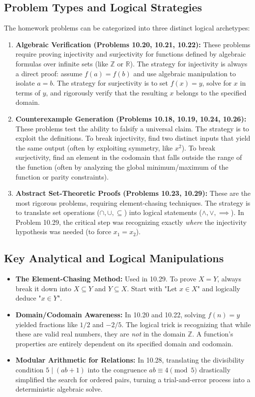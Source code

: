 \documentclass[11pt, a4paper]{article}
\theoremstyle{definition}
\theoremstyle{remark}
\newcommand{\R}{\mathbb{R}}
\newcommand{\Z}{\mathbb{Z}}
\begin{document}
\subsection{Problem Types and Logical Strategies}
The homework problems can be categorized into three distinct logical archetypes:
\begin{enumerate}
    \item \textbf{Algebraic Verification (Problems 10.20, 10.21, 10.22):} These problems require proving injectivity and surjectivity for functions defined by algebraic formulas over infinite sets (like $\Z$ or $\R$). The strategy for injectivity is always a direct proof: assume $f(a) = f(b)$ and use algebraic manipulation to isolate $a = b$. The strategy for surjectivity is to set $f(x) = y$, solve for $x$ in terms of $y$, and rigorously verify that the resulting $x$ belongs to the specified domain.
    \item \textbf{Counterexample Generation (Problems 10.18, 10.19, 10.24, 10.26):} These problems test the ability to falsify a universal claim. The strategy is to exploit the definitions. To break injectivity, find two distinct inputs that yield the same output (often by exploiting symmetry, like $x^2$). To break surjectivity, find an element in the codomain that falls outside the range of the function (often by analyzing the global minimum/maximum of the function or parity constraints).
    \item \textbf{Abstract Set-Theoretic Proofs (Problems 10.23, 10.29):} These are the most rigorous problems, requiring element-chasing techniques. The strategy is to translate set operations ($\cap, \cup, \subseteq$) into logical statements ($\land, \lor, \implies$). In Problem 10.29, the critical step was recognizing exactly \textit{where} the injectivity hypothesis was needed (to force $x_1 = x_2$).
\end{enumerate}

\subsection{Key Analytical and Logical Manipulations}
\begin{itemize}
    \item \textbf{The Element-Chasing Method:} Used in 10.29. To prove $X = Y$, always break it down into $X \subseteq Y$ and $Y \subseteq X$. Start with "Let $x \in X$" and logically deduce "$x \in Y$".
    \item \textbf{Domain/Codomain Awareness:} In 10.20 and 10.22, solving $f(n) = y$ yielded fractions like $1/2$ and $-2/5$. The logical trick is recognizing that while these are valid real numbers, they are \textit{not} in the domain $\Z$. A function's properties are entirely dependent on its specified domain and codomain.
    \item \textbf{Modular Arithmetic for Relations:} In 10.28, translating the divisibility condition $5 \mid (ab + 1)$ into the congruence $ab \equiv 4 \pmod 5$ drastically simplified the search for ordered pairs, turning a trial-and-error process into a deterministic algebraic solve.
\end{itemize}
\end{document}
